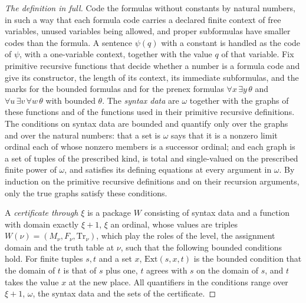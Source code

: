 \documentclass[11pt]{article}
\begin{document}
\begin{proof}[The definition in full]
Code the formulas without constants by natural numbers, in such a way that each
formula code carries a declared finite context of free variables, unused variables being allowed, and proper
subformulas have smaller codes than the formula. A sentence
$\psi(q)$ with a constant is handled as the code of $\psi$, with a one-variable context, together with the value $q$
of that variable. Fix primitive recursive functions that decide whether a number is a formula code and give its
constructor, the length of its context, its immediate subformulas, and the marks for the bounded formulas and for the
prenex formulas $\forall x\, \exists y\, \theta$ and $\forall u\, \exists v\, \forall w\, \theta$ with bounded
$\theta$. The \emph{syntax data} are $\omega$ together with the graphs of these functions and of the functions used in
their primitive recursive definitions. The conditions on syntax data are bounded and quantify only over the graphs
and over the natural numbers: that a set is $\omega$ says that it is a nonzero limit ordinal each of whose nonzero
members is a successor ordinal; and each graph is a set of tuples of the prescribed kind, is total and single-valued
on the prescribed finite power of $\omega$, and satisfies its defining equations at every argument in $\omega$. By
induction on the primitive recursive definitions and on their recursion arguments, only the true graphs satisfy these
conditions.

A \emph{certificate through $\xi$} is a package $W$ consisting of syntax data and a function with domain exactly
$\xi+1$, $\xi$ an ordinal, whose values
are triples $W(\nu) = (M_\nu, F_\nu, \mathrm{Tr}_\nu)$, which play the roles of the level, the assignment domain
and the truth table at $\nu$, such that the following bounded conditions hold. For finite tuples $s, t$ and a set
$x$, $\mathrm{Ext}(s, x, t)$ is the bounded condition that the domain of $t$ is that of $s$ plus one, $t$ agrees with
$s$ on the domain of $s$, and $t$ takes the value $x$ at the new place. All quantifiers in the conditions range over
$\xi+1$, $\omega$, the syntax data and the sets of the certificate.


\end{proof}
\end{document}
